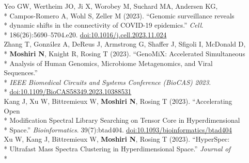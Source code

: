 \documentclass[margin,line]{res}
\begin{document}
\begin{resume}
\hspace*{9mm} Yeo GW, Wertheim JO, Ji X, Worobey M, Suchard MA, Andersen KG,\\*
\hspace*{9mm} Campos-Romero A, Wohl S, Zeller M (2023). ``Genomic surveillance reveals\\*
\hspace*{9mm} dynamic shifts in the connectivity of COVID-19 epidemics.'' \textit{Cell}.\\*\vspace{2mm}
\hspace*{8mm} 186(26):5690--5704.e20. \href{https://doi.org/10.1016/j.cell.2023.11.024}{doi:10.1016/j.cell.2023.11.024}\\
\hspace*{4mm} Zhang T, Gonz\'alez A, DeReus J, Armstrong G, Shaffer J, Sfigoli I, McDonald D,\\*
\hspace*{9mm} \textbf{Moshiri N}, Knight R, Rosing T (2023). ``GenoMiX: Accelerated Simultaneous\\*
\hspace*{9mm} Analysis of Human Genomics, Microbiome Metagenomics, and Viral Sequences.''\\*
\hspace*{9mm} \textit{IEEE Biomedical Circuits and Systems Conference (BioCAS) 2023}.\\*\vspace{2mm}
\hspace*{7mm} \href{https://doi.org/10.1109/BioCAS58349.2023.10388531}{doi:10.1109/BioCAS58349.2023.10388531}\\
\hspace*{4mm} Kang J, Xu W, Bittremieux W, \textbf{Moshiri N}, Rosing T (2023). ``Accelerating Open\\*
\hspace*{9mm} Modification Spectral Library Searching on Tensor Core in Hyperdimensional\\*\vspace{2mm}
\hspace*{8mm} Space.'' \textit{Bioinformatics}. 39(7):btad404. \href{https://doi.org/10.1093/bioinformatics/btad404}{doi:10.1093/bioinformatics/btad404}\\
\hspace*{4mm} Xu W, Kang J, Bittremieux W, \textbf{Moshiri N}, Rosing T (2023). ``HyperSpec:\\*
\hspace*{9mm} Ultrafast Mass Spectra Clustering in Hyperdimensional Space.'' \textit{Journal of}\\*\vspace{2mm}

\end{resume}
\end{document}
